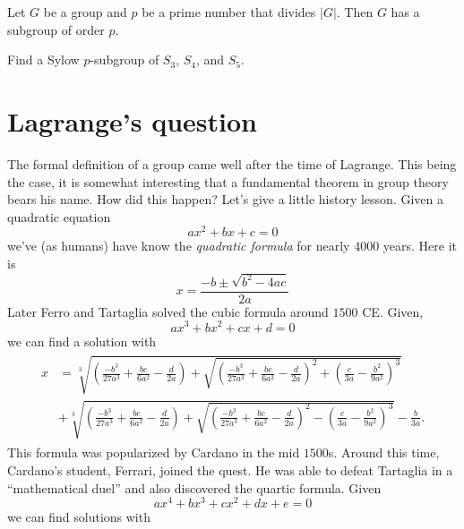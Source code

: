 \documentclass{ximera}
\begin{document}
\begin{corollary}
  Let $G$ be a group and $p$ be a prime number that divides
  $|G|$. Then $G$ has a subgroup of order $p$.
\end{corollary}

\begin{exercise}
  Find a Sylow $p$-subgroup of $S_3$, $S_4$, and $S_5$.
\end{exercise}





\section{Lagrange's question}

The formal definition of a group came well after the time of
Lagrange. This being the case, it is somewhat interesting that a
fundamental theorem in group theory bears his name. How did this
happen? Let's give a little history lesson. Given a quadratic equation
\[
ax^2 + bx + c = 0
\]
we've (as humans) have know the \textit{quadratic
  formula} for nearly $4000$ years. Here it
is
\[
x = \frac{-b \pm \sqrt{b^2-4ac}}{2a}
\]
Later Ferro and Tartaglia solved the cubic formula around $1500$ CE. Given,
\[
ax^3 + bx^2 + cx + d = 0
\]
we can find a solution with
\begin{gather}
\begin{align*}
  x &= \sqrt[3]{\left(\frac{-b^3}{27a^3}+\frac{bc}{6a^2}-\frac{d}{2a}\right)+\sqrt{\left(\frac{-b^3}{27a^3}+\frac{bc}{6a^2}-\frac{d}{2a}\right)^2 + \left(\frac{c}{3a}-\frac{b^2}{9a^2}\right)^3}} \\
    &+ \sqrt[3]{\left(\frac{-b^3}{27a^3}+\frac{bc}{6a^2}-\frac{d}{2a}\right)+\sqrt{\left(\frac{-b^3}{27a^3}+\frac{bc}{6a^2}-\frac{d}{2a}\right)^2 - \left(\frac{c}{3a}-\frac{b^2}{9a^2}\right)^3}} -\frac{b}{3a}.
\end{align*}
\end{gather}
This formula was popularized by Cardano in the mid $1500$s.  Around
this time, Cardano's student, Ferrari, joined the quest. He was able
to defeat Tartaglia in a ``mathematical duel'' and also discovered the
quartic formula.  Given
\[
ax^4 + bx^3 + cx^2 + dx + e = 0
\]
we can find solutions with
\end{document}

